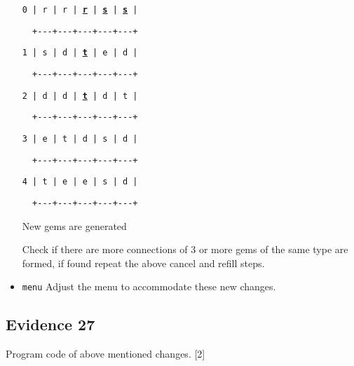 \begin{itemize}
\begin{minipage}[t]{0.5\columnwidth}
\texttt{0 | r | r | }\texttt{\textbf{\uline{r}}}\texttt{ | }\texttt{\textbf{\uline{s}}}\texttt{
| }\texttt{\textbf{\uline{s}}}\texttt{ |}

\texttt{~~+-{}-{}-+-{}-{}-+-{}-{}-+-{}-{}-+-{}-{}-+ }

\texttt{1 | s | d | }\texttt{\textbf{\uline{t}}}\texttt{ | e |
d | }

\texttt{~~+-{}-{}-+-{}-{}-+-{}-{}-+-{}-{}-+-{}-{}-+ }

\texttt{2 | d | d | }\texttt{\textbf{\uline{t}}}\texttt{ | d |
t | }

\texttt{~~+-{}-{}-+-{}-{}-+-{}-{}-+-{}-{}-+-{}-{}-+ }

\texttt{3 | e | t | d | s | d |}

\texttt{~~+-{}-{}-+-{}-{}-+-{}-{}-+-{}-{}-+-{}-{}-+ }

\texttt{4 | t | e | e | s | d |}

\texttt{~~+-{}-{}-+-{}-{}-+-{}-{}-+-{}-{}-+-{}-{}-+ }

New gems are generated %
\end{minipage}

Check if there are more connections of 3 or more gems of the same
type are formed, if found repeat the above cancel and refill steps. 
\item \texttt{menu} Adjust the menu to accommodate these new changes. 
\end{itemize}

\subsection*{Evidence 27 }

Program code of above mentioned changes. \hfill{}{[}2{]}